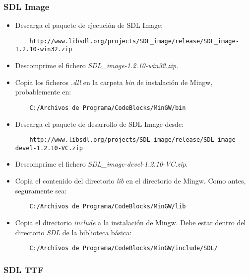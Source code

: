 \documentclass[16pt,spanish]{article}
\begin{document}
\subsubsection{SDL Image}

\begin{itemize}
	\item Descarga el paquete de ejecución de SDL Image:
	\begin{verbatim}
	http://www.libsdl.org/projects/SDL_image/release/SDL_image-1.2.10-win32.zip
	\end{verbatim}
	\item Descomprime el fichero \emph{SDL\_image-1.2.10-win32.zip}.
	\item Copia los ficheros \emph{.dll} en la carpeta \emph{bin} de instalación
	de Mingw, probablemente en:
	\begin{verbatim}
	C:/Archivos de Programa/CodeBlocks/MinGW/bin
	\end{verbatim}
	\item Descarga el paquete de desarrollo de SDL Image desde:
	\begin{verbatim}
	http://www.libsdl.org/projects/SDL_image/release/SDL_image-devel-1.2.10-VC.zip
	\end{verbatim}
	\item Descomprime el fichero \emph{SDL\_image-devel-1.2.10-VC.zip}.
	\item Copia el contenido del directorio \emph{lib} en el directorio
	de Mingw. Como antes, seguramente sea:
	\begin{verbatim}
	C:/Archivos de Programa/CodeBlocks/MinGW/lib
	\end{verbatim}
	\item Copia el directorio \emph{include} a la instalación de Mingw.
	Debe estar dentro del directorio \emph{SDL} de la biblioteca básica:
	\begin{verbatim}
	C:/Archivos de Programa/CodeBlocks/MinGW/include/SDL/
	\end{verbatim}
\end{itemize}

\subsubsection{SDL TTF}
\end{document}
